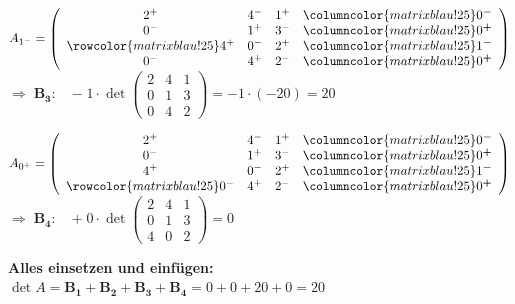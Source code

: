 \documentclass[a4paper,11pt,oneside,open=any,parskip=half, DIV=15]{scrreprt}
\begin{document}
\begin{enumerate}
               \vspace{1em}

               \(
                  A_{1^{-}}=
                        \left(
                           \begin{array}{c c c >{\columncolor{matrixblau!25}}c}
                              2^{+} & 4^{-} & 1^{+} & 0^{\boldsymbol{-}}\\
                              0^{-} & 1^{+} & 3^{-} & 0^{\boldsymbol{+}}\\
                              \rowcolor{matrixblau!25}
                              4^{+} & 0^{-} & 2^{+} & 1^{\boldsymbol{-}}\\
                              0^{-} & 4^{+} & 2^{-} & 0^{\boldsymbol{+}}
                           \end{array}
                        \right)
               \) \quad \(\Rightarrow \; \mathbf{B_{3}:} \quad \boldsymbol{-} \; 1 \cdot \det\begin{pmatrix}2&4&1\\0&1&3\\0&4&2\end{pmatrix} = \boldsymbol{-} 1 \cdot (-20) = 20\)
               
               \vspace{1em}

               \(
                  A_{0^{+}}=
                        \left(
                           \begin{array}{c c c >{\columncolor{matrixblau!25}}c}
                              2^{+} & 4^{-} & 1^{+} & 0^{\boldsymbol{-}}\\
                              0^{-} & 1^{+} & 3^{-} & 0^{\boldsymbol{+}}\\
                              4^{+} & 0^{-} & 2^{+} & 1^{\boldsymbol{-}}\\
                              \rowcolor{matrixblau!25}
                              0^{-} & 4^{+} & 2^{-} & 0^{\boldsymbol{+}}
                           \end{array}
                        \right)
               \) \quad \(\Rightarrow \; \mathbf{B_{4}:} \quad \boldsymbol{+} \; 0 \cdot \det\begin{pmatrix}2&4&1\\0&1&3\\4&0&2\end{pmatrix} = 0\)

               \vspace{1em}

               \textbf{Alles einsetzen und einfügen:}\\ 
               \(\det A = \mathbf{B_{1}} + \mathbf{B_{2}} + \mathbf{B_{3}} + \mathbf{B_{4}} = 0 + 0 + 20 + 0 = 20\)
      \end{enumerate}
\end{document}
